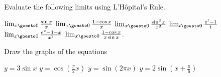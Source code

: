 \begin{exercises}
Evaluate the following limits using
L'H\^opital's Rule.
\begin{exenum}
\x
$\lim_{x\goesto0} \frac{\sin x}{x}$
\x
$\lim_{x\goesto0} \frac{1 - \cos x}{x}$
\x
$\lim_{x\goesto0} \frac{\sin^2 x}{x^2}$
\x
$\lim_{t\goesto0} \frac{e^t - 1}{t}$
\x
$\lim_{x\goesto0} \frac{e^x - 1 - x}{x^2}$
\x
$\lim_{x\goesto0} \frac{1 - \cos x}{x \sin x}$.
\end{exenum}

Draw the graphs of the equations
\begin{exenum}
\x
$y = 3 \sin x$
\x
$y = \cos \left( \frac{\pi}2 x \right)$
\x
$y = \sin(2\pi x)$
\x
$y = 2 \sin \left( x + \frac{\pi}6 \right)$
\end{exenum}

\end{exercises}
